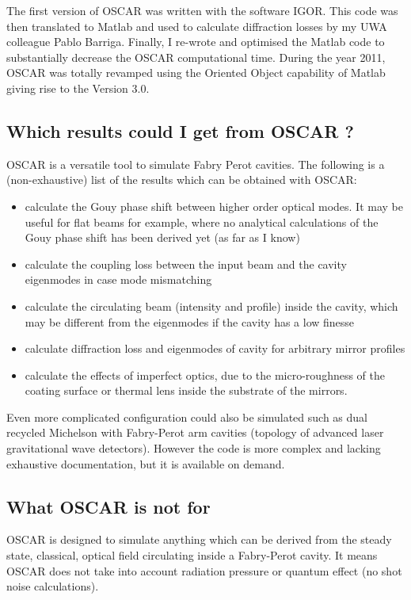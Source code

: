 The first version of OSCAR was written with the software IGOR. This code was then translated to Matlab and used to calculate diffraction losses by my UWA colleague Pablo Barriga. Finally, I re-wrote and optimised the Matlab code to substantially decrease the OSCAR computational time. During the year 2011, OSCAR was totally revamped using the Oriented Object capability of Matlab giving rise to the Version 3.0.

\subsection{Which results could I get from OSCAR ?}

OSCAR is a versatile tool to simulate Fabry Perot cavities. The following is a (non-exhaustive) list of the results which can be obtained with OSCAR:
\begin{itemize}
  \item calculate the Gouy phase shift between higher order optical modes. It may be useful for flat beams for example, where no analytical calculations of the Gouy phase shift has been derived yet (as far as I know)
  \item calculate the coupling loss between the input beam and the cavity eigenmodes in case mode mismatching
  \item calculate the circulating beam (intensity and profile) inside the cavity, which may be different from the eigenmodes if the cavity has a low finesse
  \item calculate diffraction loss and eigenmodes of cavity for arbitrary mirror profiles
  \item calculate the effects of imperfect optics, due to the micro-roughness of the coating surface or thermal lens inside the substrate of the mirrors.
\end{itemize}

Even more complicated configuration could also be simulated such as dual recycled Michelson with Fabry-Perot arm cavities (topology of advanced laser gravitational wave detectors). However the code is more complex and lacking exhaustive documentation, but it is available on demand.

\subsection{What OSCAR is not for}

OSCAR is designed to simulate anything which can be derived from the steady state, classical, optical field circulating inside a Fabry-Perot cavity. It means OSCAR does not take into account radiation pressure or quantum effect (no shot noise calculations).

